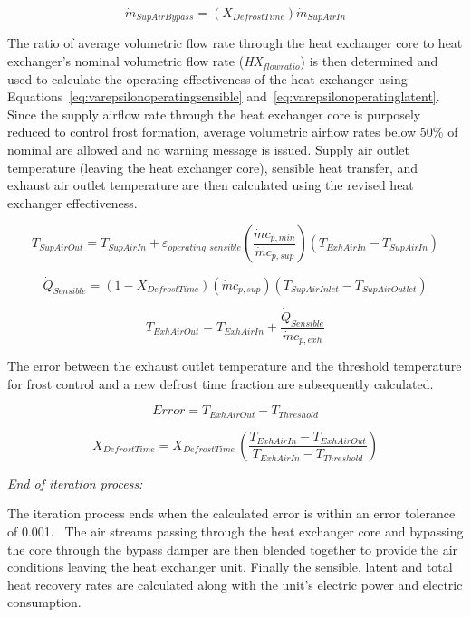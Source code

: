 \begin{equation}
{\dot{m}_{SupAirBypass}} = ({X_{DefrostTime}}){\dot{m}_{SupAirIn}}
\end{equation}

The ratio of average volumetric flow rate through the heat exchanger core to heat exchanger's nominal volumetric flow rate (\emph{HX\(_{flowratio}\)}) is then determined and used to calculate the operating effectiveness of the heat exchanger using Equations~\ref{eq:varepsilonoperatingsensible} and~\ref{eq:varepsilonoperatinglatent}. Since the supply airflow rate through the heat exchanger core is purposely reduced to control frost formation, average volumetric airflow rates below 50\% of nominal are allowed and no warning message is issued. Supply air outlet temperature (leaving the heat exchanger core), sensible heat transfer, and exhaust air outlet temperature are then calculated using the revised heat exchanger effectiveness.

\begin{equation}
{T_{SupAirOut}} = {T_{SupAirIn}} + {\varepsilon_{operating,sensible}}\left( {\frac{{\dot{m}  c_{p,min}}}{{\dot{m} c_{p,sup}}}} \right)({T_{ExhAirIn}} - {T_{SupAirIn}})
\end{equation}

\begin{equation}
{\dot{Q}_{Sensible}} = (1 - {X_{DefrostTime}})\left( {\dot{m} c_{p,sup}} \right)({T_{SupAirInlet}} - {T_{SupAirOutlet}})
\end{equation}

\begin{equation}
{T_{ExhAirOut}} = {T_{ExhAirIn}} + \frac{\dot{Q}_{Sensible}}{\dot{m} c_{p,exh}}
\end{equation}

The error between the exhaust outlet temperature and the threshold temperature for frost control and a new defrost time fraction are subsequently calculated.

\begin{equation}
Error = {T_{ExhAirOut}} - {T_{Threshold}}
\end{equation}

\begin{equation}
{X_{DefrostTime}} = {X_{DefrostTime}}\,\left( {\frac{{{T_{ExhAirIn}} - {T_{ExhAirOut}}}}{{{T_{ExhAirIn}} - {T_{Threshold}}}}} \right)
\end{equation}

\emph{End of iteration process:}

The iteration process ends when the calculated error is within an error tolerance of 0.001.~ The air streams passing through the heat exchanger core and bypassing the core through the bypass damper are then blended together to provide the air conditions leaving the heat exchanger unit. Finally the sensible, latent and total heat recovery rates are calculated along with the unit's electric power and electric consumption.

